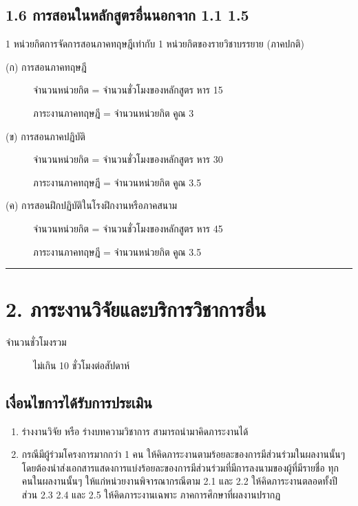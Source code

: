\documentclass[a4paper,12pt,english]{sphinxmanual}
\begin{document}
\subsection{1.6 การสอนในหลักสูตรอื่นนอกจาก 1.1 \sphinxhyphen{} 1.5}
\label{\detokenize{workload_rubric:id21}}
1 หน่วยกิตการจัดการสอนภาคทฤษฎีเท่ากับ 1 หน่วยกิตของรายวิชาบรรยาย (ภาคปกติ)
\begin{description}
\item[{(ก) การสอนภาคทฤษฎี}] \leavevmode
จำนวนหน่วยกิต = จำนวนชั่วโมงของหลักสูตร หาร 15

ภาระงานภาคทฤษฎี = จำนวนหน่วยกิต คูณ 3

\item[{(ข) การสอนภาคปฏิบัติ}] \leavevmode
จำนวนหน่วยกิต = จำนวนชั่วโมงของหลักสูตร หาร 30

ภาระงานภาคทฤษฎี = จำนวนหน่วยกิต คูณ 3.5

\item[{(ค) การสอนฝึกปฏิบัติในโรงฝึกงานหรือภาคสนาม}] \leavevmode
จำนวนหน่วยกิต = จำนวนชั่วโมงของหลักสูตร หาร 45

ภาระงานภาคทฤษฎี = จำนวนหน่วยกิต คูณ 3.5

\end{description}


\bigskip\hrule\bigskip



\section{2. ภาระงานวิจัยและบริการวิชาการอื่น}
\label{\detokenize{workload_rubric:id22}}\begin{description}
\item[{จำนวนชั่วโมงรวม}] \leavevmode
ไม่เกิน 10 ชั่วโมงต่อสัปดาห์

\end{description}


\subsection{เงื่อนไขการได้รับการประเมิน}
\label{\detokenize{workload_rubric:id23}}\begin{enumerate}
%
\item {} 
ร่างงานวิจัย หรือ ร่างบทความวิชาการ  สามารถนำมาคิดภาระงานได้

\item {} 
กรณีมีผู้ร่วมโครงการมากกว่า 1 คน ให้คิดภาระงานตามร้อยละของการมีส่วนร่วมในผลงานนั้นๆ โดยต้องนำส่งเอกสารแสดงการแบ่งร้อยละของการมีส่วนร่วมที่มีการลงนามของผู้ที่มีรายชื่อ ทุกคนในผลงานนั้นๆ ให้แก่หน่วยงานพิจารณากรณีตาม 2.1 และ 2.2 ให้คิดภาระงานตลอดทั้งปี ส่วน 2.3 2.4 และ 2.5 ให้คิดภาระงานเฉพาะ ภาคการศึกษาที่ผลงานปรากฏ

\end{enumerate}
\end{document}
